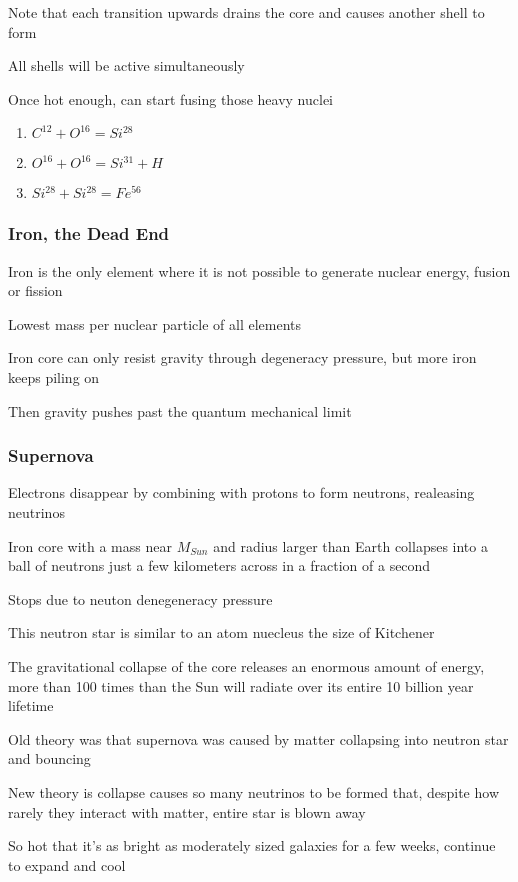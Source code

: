 Note that each transition upwards drains the core and causes another shell to form

All shells will be active simultaneously

Once hot enough, can start fusing those heavy nuclei
\begin{enumerate}
\item $C^{12} + O^{16} = Si^{28}$
\item $O^{16} + O^{16} = Si^{31} + H$
\item $Si^{28}+ Si^{28} = Fe^{56}$
\end{enumerate}
\subsubsection{Iron, the Dead End}
Iron is the only element where it is not possible to generate nuclear energy, fusion or fission

Lowest mass per nuclear particle of all elements

Iron core can only resist gravity through degeneracy pressure, but more iron keeps piling on

Then gravity pushes past the quantum mechanical limit

\subsubsection{Supernova}
Electrons disappear by combining with protons to form neutrons, realeasing neutrinos

Iron core with a mass near $M_{Sun}$ and radius larger than Earth collapses into a ball of neutrons just a few kilometers across in a fraction of a second

Stops due to neuton denegeneracy pressure

This neutron star is similar to an atom nuecleus the size of Kitchener

The gravitational collapse of the core releases an enormous amount of energy, more than 100 times than the Sun will radiate over its entire 10 billion year lifetime

Old theory was that supernova was caused by matter collapsing into neutron star and bouncing

New theory is collapse causes so many neutrinos to be formed that, despite how rarely they interact with matter, entire star is blown away

So hot that it's as bright as moderately sized galaxies for a few weeks, continue to expand and cool

